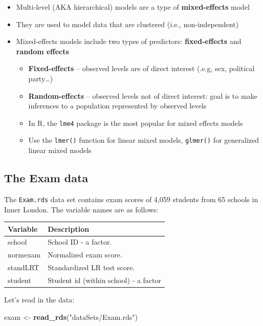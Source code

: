 \documentclass[
]{book}
\newenvironment{Shaded}{\begin{snugshade}}{\end{snugshade}}
\newcommand{\KeywordTok}[1]{\textcolor[rgb]{0.13,0.29,0.53}{\textbf{#1}}}
\newcommand{\NormalTok}[1]{#1}
\newcommand{\StringTok}[1]{\textcolor[rgb]{0.31,0.60,0.02}{#1}}
\providecommand{\tightlist}{%
  \setlength{\itemsep}{0pt}\setlength{\parskip}{0pt}}
\begin{document}
\begin{itemize}
\tightlist
\item
  Multi-level (AKA hierarchical) models are a type of \textbf{mixed-effects} model
\item
  They are used to model data that are clustered (i.e., non-independent)
\item
  Mixed-effects models include two types of predictors: \textbf{fixed-effects} and \textbf{random effects}

  \begin{itemize}
  \tightlist
  \item
    \textbf{Fixed-effects} -- observed levels are of direct interest (.e.g, sex, political party\ldots)
  \item
    \textbf{Random-effects} -- observed levels not of direct interest: goal is to make inferences to a population represented by observed levels
  \item
    In R, the \texttt{lme4} package is the most popular for mixed effects models
  \item
    Use the \texttt{lmer()} function for linear mixed models, \texttt{glmer()} for generalized linear mixed models
  \end{itemize}
\end{itemize}

\hypertarget{the-exam-data}{%
\subsection{The Exam data}\label{the-exam-data}}

The \texttt{Exam.rds} data set contains exam scores of 4,059 students from 65 schools in Inner London. The variable names are as follows:

\begin{longtable}[]{@{}ll@{}}
\toprule
Variable & Description\tabularnewline
\midrule
\endhead
school & School ID - a factor.\tabularnewline
normexam & Normalized exam score.\tabularnewline
standLRT & Standardized LR test score.\tabularnewline
student & Student id (within school) - a factor\tabularnewline
\bottomrule
\end{longtable}

Let's read in the data:

\begin{Shaded}
\begin{Highlighting}[]
\NormalTok{  exam \textless{}{-}}\StringTok{ }\KeywordTok{read\_rds}\NormalTok{(}\StringTok{"dataSets/Exam.rds"}\NormalTok{)}
\end{Highlighting}
\end{Shaded}
\end{document}
